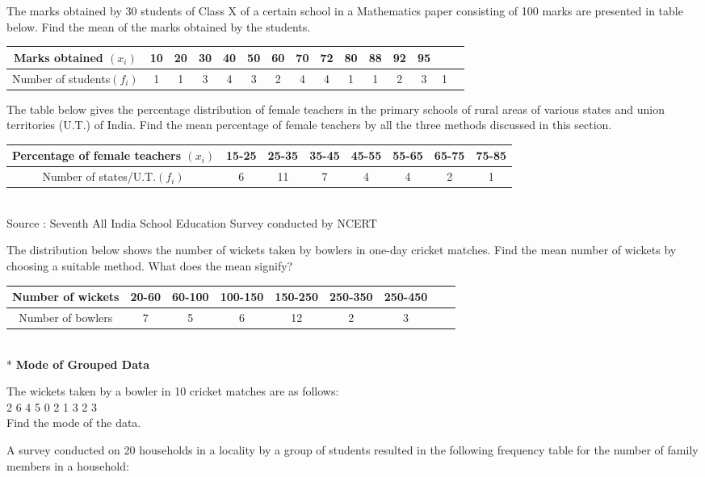 \item The marks obtained by 30 students of Class X of a certain school in a Mathematics paper consisting of 100 marks are presented in table below. Find the mean of the marks obtained by the students.\\
\begin{tabular}{|c|c|c|c|c|c|c||c|c|c|c|c|c|c|c|}
\hline
Marks obtained $(x_i)$&10&20&30&40&50&60&70&72&80&88&92&95\\
\hline
Number of students$(f_i)$ &1&1&3&4&3&2&4&4&1&1&2&3&1\\
\hline
\end{tabular}
\item The table below gives the percentage distribution of female teachers in the primary schools of rural areas of various states and union territories (U.T.) of India. Find the mean percentage of female teachers by all the three methods discussed
in this section.\\
\begin{tabular}{|c|c|c|c|c|c|c|c|}
\hline
Percentage of female teachers $(x_i)$&15-25&25-35&35-45&45-55&55-65&65-75&75-85\\
\hline
Number of states/U.T.$(f_i)$&6&11&7&4&4&2&1\\
\hline
\end{tabular}\\
Source : Seventh All India School Education Survey conducted by NCERT
\item The distribution below shows the number of wickets taken by bowlers in one-day cricket matches. Find the mean number of wickets by choosing a suitable
method. What does the mean signify?
\begin{tabular}{|c|c|c|c|c|c|c|c|c|}
\hline
Number of wickets &20-60&60-100&100-150&150-250&250-350&250-450\\
\hline
Number of bowlers &7&5&6&12&2&3\\
\hline
\end{tabular}\\*
{\Large \textbf{Mode of Grouped Data}}
\item The wickets taken by a bowler in 10 cricket matches are as follows:\\
2 6 4 5 0 2 1 3 2 3\\
Find the mode of the data.\\
\item A survey conducted on 20 households in a locality by a group of students
resulted in the following frequency table for the number of family members in a
household:
